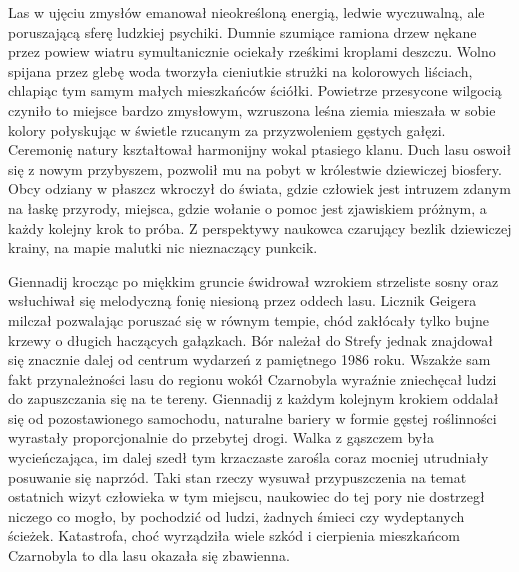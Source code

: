 \documentclass[../MAIN.tex]{subfiles}
\begin{document}
% 
Las w ujęciu zmysłów emanował nieokreśloną energią, ledwie wyczuwalną, ale poruszającą sferę ludzkiej psychiki. Dumnie szumiące ramiona drzew nękane przez powiew wiatru symultanicznie ociekały rześkimi kroplami deszczu. Wolno spijana przez glebę woda tworzyła cieniutkie strużki na kolorowych liściach, chlapiąc tym samym małych mieszkańców ściółki. Powietrze przesycone wilgocią czyniło to miejsce bardzo zmysłowym, wzruszona leśna ziemia mieszała w sobie kolory połyskując w świetle rzucanym za przyzwoleniem gęstych gałęzi. Ceremonię natury kształtował harmonijny wokal ptasiego klanu. Duch lasu oswoił się z nowym przybyszem, pozwolił mu na pobyt w królestwie dziewiczej biosfery. Obcy odziany w płaszcz wkroczył do świata, gdzie człowiek jest intruzem zdanym na łaskę przyrody, miejsca, gdzie wołanie o pomoc jest zjawiskiem próżnym, a każdy kolejny krok to próba. Z perspektywy naukowca czarujący bezlik dziewiczej krainy, na mapie malutki nic nieznaczący punkcik. 

Giennadij krocząc po miękkim gruncie świdrował wzrokiem strzeliste sosny oraz wsłuchiwał się melodyczną fonię niesioną przez oddech lasu. Licznik Geigera milczał pozwalając poruszać się w równym tempie, chód zakłócały tylko bujne krzewy o długich haczących gałązkach. Bór należał do Strefy jednak znajdował się znacznie dalej od centrum wydarzeń z pamiętnego 1986 roku. Wszakże sam fakt przynależności lasu do regionu wokół Czarnobyla wyraźnie zniechęcał ludzi do zapuszczania się na te tereny. Giennadij z każdym kolejnym krokiem oddalał się od pozostawionego samochodu, naturalne bariery w formie gęstej roślinności wyrastały proporcjonalnie do przebytej drogi. Walka z gąszczem była wycieńczająca, im dalej szedł tym krzaczaste zarośla coraz mocniej utrudniały posuwanie się naprzód. Taki stan rzeczy wysuwał przypuszczenia na temat ostatnich wizyt człowieka w tym miejscu, naukowiec do tej pory nie dostrzegł niczego co mogło, by pochodzić od ludzi, żadnych śmieci czy wydeptanych ścieżek. Katastrofa, choć wyrządziła 
wiele szkód i cierpienia mieszkańcom Czarnobyla to dla lasu okazała się zbawienna. 
\end{document}
